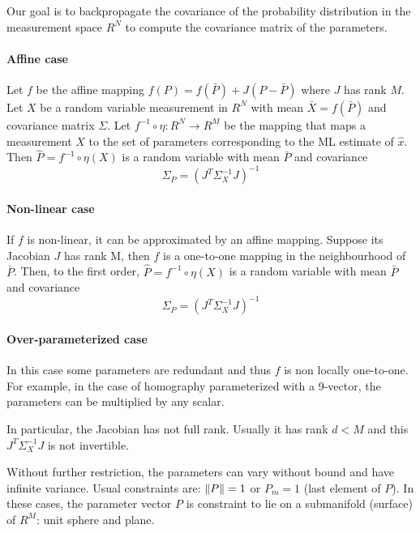 Our goal is to backpropagate the covariance of the probability distribution in the measurement space $R^N$ to compute the covariance matrix of the parameters.

\paragraph{Affine case}
Let $f$ be the affine mapping $f(P) = f(\bar{P}) + J(P-\bar{P})$ where $J$ has rank $M$. Let $X$ be a random variable measurement in $R^N$ with mean $\bar{X}=f(\bar{P})$ and covariance matrix $\Sigma$. Let $f^{-1} \circ \eta: R^N \rightarrow R^M$ be the mapping that maps a measurement $X$ to the set of parameters corresponding to the ML estimate of $\hat{x}$. Then $\hat{P}=f^{-1} \circ \eta(X)$ is a random variable with mean $\bar{P}$ and covariance
\begin{equation}
    \Sigma_P = (J^T \Sigma_X^{-1} J)^{-1}
\end{equation}

\paragraph{Non-linear case}
If $f$ is non-linear, it can be approximated by an affine mapping. Suppose its Jacobian $J$ has rank M, then $f$ is a one-to-one mapping in the neighbourhood of $\bar{P}$. Then, to the first order, $\hat{P} = f^{-1} \circ \eta(X)$ is a random variable with mean $\bar{P}$ and covariance
\begin{equation}
    \Sigma_P = (J^T \Sigma_X^{-1}J)^{-1}
\end{equation}{}



\paragraph{Over-parameterized case}
In this case some parameters are redundant and thus $f$ is non locally one-to-one. For example, in the case of homography parameterized with a 9-vector, the parameters can be multiplied by any scalar. 

In particular, the Jacobian has not full rank. Usually it has rank $d < M$ and this $J^T\Sigma_X^{-1}J$ is not invertible.

Without further restriction, the parameters can vary without bound and have infinite variance.
Usual constraints are: $\left\lVert P\right\rVert = 1$ or $P_m = 1$ (last element of $P$).
In these cases, the parameter vector $P$ is constraint to lie on a submanifold (surface) of $R^M$: unit sphere and plane.

